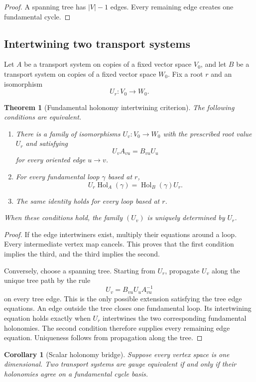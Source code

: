 \documentclass{aomart}
\newtheorem{theorem}{Theorem}[section]
\newtheorem{corollary}[corollary]{Corollary}
\theoremstyle{definition}
\theoremstyle{remark}
\newcommand{\Hol}{\operatorname{Hol}}
\begin{document}
\begin{proof}
A spanning tree has $|V|-1$ edges.  Every remaining edge creates one fundamental cycle.
\end{proof}


\subsection{Intertwining two transport systems}

Let $A$ be a transport system on copies of a fixed vector space $V_0$, and let $B$ be a transport system on copies of a fixed vector space $W_0$.  Fix a root $r$ and an isomorphism
\[
U_r:V_0\longrightarrow W_0.
\]

\begin{theorem}[Fundamental holonomy intertwining criterion]\label{thm:holonomy_intertwining}
The following conditions are equivalent.
\begin{enumerate}
\item There is a family of isomorphisms $U_v:V_0\to W_0$ with the prescribed root value $U_r$ and satisfying
\[
U_vA_{vu}=B_{vu}U_u
\]
for every oriented edge $u\to v$.
\item For every fundamental loop $\gamma$ based at $r$,
\[
U_r\Hol_A(\gamma)=\Hol_B(\gamma)U_r.
\]
\item The same identity holds for every loop based at $r$.
\end{enumerate}
When these conditions hold, the family $(U_v)$ is uniquely determined by $U_r$.
\end{theorem}

\begin{proof}
If the edge intertwiners exist, multiply their equations around a loop.  Every intermediate vertex map cancels.  This proves that the first condition implies the third, and the third implies the second.

Conversely, choose a spanning tree.  Starting from $U_r$, propagate $U_v$ along the unique tree path by the rule
\[
U_v=B_{vu}U_uA_{vu}^{-1}
\]
on every tree edge.  This is the only possible extension satisfying the tree edge equations.  An edge outside the tree closes one fundamental loop.  Its intertwining equation holds exactly when $U_r$ intertwines the two corresponding fundamental holonomies.  The second condition therefore supplies every remaining edge equation.  Uniqueness follows from propagation along the tree.
\end{proof}

\begin{corollary}[Scalar holonomy bridge]\label{cor:scalar_holonomy_bridge}
Suppose every vertex space is one dimensional.  Two transport systems are gauge equivalent if and only if their holonomies agree on a fundamental cycle basis.
\end{corollary}
\end{document}
